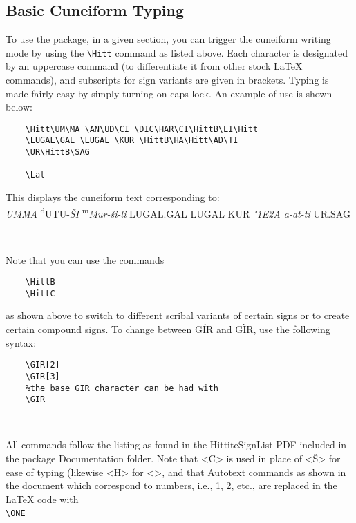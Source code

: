 \documentclass[12pt,A4]{article}
\begin{document}
\subsection{Basic Cuneiform Typing}
To use the package, in a given section, you can trigger the cuneiform writing mode by using the \verb|\Hitt| command as listed above. Each character is designated by an uppercase command (to differentiate it from other stock LaTeX commands), and subscripts for sign variants are given in brackets. Typing is made fairly easy by simply turning on caps lock. An example of use is shown below:
\begin{verbatim}
    \Hitt\UM\MA \AN\UD\CI \DIC\HAR\CI\HittB\LI\Hitt 
    \LUGAL\GAL \LUGAL \KUR \HittB\HA\Hitt\AD\TI 
    \UR\HittB\SAG

    \Lat
\end{verbatim}
This displays the cuneiform text corresponding to: 
\\

\textit{UMMA} \textsuperscript{d}UTU-\textit{\v{S}I} \textsuperscript{m}\textit{Mur-\v{s}i-li} LUGAL.GAL LUGAL KUR \textit{\char"1E2A a-at-ti} UR.SAG

    \Hitt\UM\MA \AN\UD\CI \DIC\HAR\CI\HittB\LI\Hitt \LUGAL\GAL \LUGAL \KUR \HittB\HA\Hitt\AD\TI \UR\HittB\SAG\\

\Lat

Note that you can use the commands
\begin{verbatim}
    \HittB
    \HittC
\end{verbatim}
as shown above to switch to different scribal variants of certain signs or to create certain compound signs. To change between G\'IR and G\`IR, use the following syntax:
\begin{verbatim}
    \GIR[2]
    \GIR[3]
    %the base GIR character can be had with
    \GIR
\end{verbatim}

\Hitt\GIR\ \GIR[2]\ \GIR[3]\Lat

All commands follow the listing as found in the HittiteSignList PDF included in the package Documentation folder. Note that <C> is used in place of <\v{S}> for ease of typing (likewise <H> for <\funH>, and that Autotext commands as shown in the document which correspond to numbers, i.e., 1, 2, etc., are replaced in the LaTeX code with \\

\verb|\ONE|\ \ \Hitt\ONE\Lat\\
\end{document}
